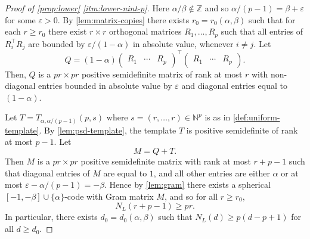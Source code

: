 \documentclass[reqno, 11pt]{amsart}
\theoremstyle{definition}
\theoremstyle{remark}
\newcommand{\NN}{\mathbb{N}}
\newcommand{\ZZ}{\mathbb{Z}}
\begin{document}
\begin{proof}[Proof of \cref{prop:lower} \ref{itm:lower-nint-p}]
Here $\alpha / \beta \notin \ZZ$ and so $\alpha/(p-1) = \beta + \varepsilon$ for some $\varepsilon > 0$. By \cref{lem:matrix-copies} there exists $r_0=r_0(\alpha,\beta)$ such that for each $r \geq r_0$ there exist $r \times r$ orthogonal matrices $R_1, \ldots, R_p$ such that all entries of $R_i^\intercal R_j$ are bounded by $\varepsilon/(1-\alpha)$ in absolute value, whenever $i \neq j$. Let
\[
    Q = (1-\alpha) \begin{pmatrix}
					R_1 & \cdots & R_p
			 \end{pmatrix}^\intercal
                \begin{pmatrix}
					R_1 & \cdots & R_p
			 \end{pmatrix}.
\]
Then, $Q$ is a $pr \times pr$ positive semidefinite matrix of rank at most $r$ with non-diagonal entries bounded in absolute value by $\varepsilon$ and diagonal entries equal to $(1-\alpha)$.

Let $T = T_{\alpha, \alpha/(p-1)}(p,s)$ where $s = (r, \ldots, r) \in \NN^p$ is as in \cref{def:uniform-template}. By \cref{lem:psd-template}, the template $T$ is positive semidefinite of rank at most $p-1$. Let
\[
    M = Q + T.
\]
Then $M$ is a $pr \times pr$ positive semidefinite matrix with rank at most $r + p-1$ such that diagonal entries of $M$ are equal to $1$, and all other entries are either $\alpha$ or at most $\varepsilon - \alpha/(p-1) = -\beta$. Hence by \cref{lem:gram} there exists a spherical $[-1,-\beta] \cup \{\alpha\}$-code with Gram matrix $M$, and so for all $r \geq r_0$,
\[
    N_L(r + p-1) \geq pr.
\]
In particular, there exists $d_0 = d_0(\alpha, \beta)$ such that $N_L(d) \geq p(d-p+1)$ for all $d \geq d_0$.
\end{proof}
\medskip
\end{document}
